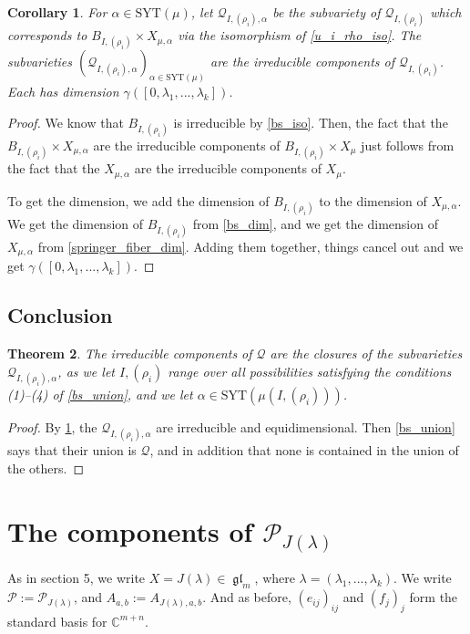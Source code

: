 \documentclass[12pt,psamsfonts]{article}
\DeclareMathOperator{\gl}{\mathfrak{gl}}
\newtheorem{theorem}{Theorem}[section]
\newtheorem{corollary}[theorem]{Corollary}
\begin{document}
\begin{corollary}\label{u_i_rho_irred_and_dim}
    For \(\alpha \in \mathrm{SYT}(\mu)\), let \(\mathcal{Q}_{I, (\rho_i), \alpha}\) be the subvariety of \(\mathcal{Q}_{I, (\rho_i)}\) which corresponds to \(B_{I, (\rho_i)} \times X_{\mu, \alpha}\) via the isomorphism of \cref{u_i_rho_iso}.
    The subvarieties \((\mathcal{Q}_{I, (\rho_i), \alpha})_{\alpha \in \mathrm{SYT}(\mu)}\) are the irreducible components of \(\mathcal{Q}_{I, (\rho_i)}\).
    Each has dimension \(\gamma([0, \lambda_1, ..., \lambda_k])\).
\end{corollary}
\begin{proof}
    We know that \(B_{I, (\rho_i)}\) is irreducible by \cref{bs_iso}.
    Then, the fact that the \(B_{I, (\rho_i)} \times X_{\mu, \alpha}\) are the irreducible components of \(B_{I, (\rho_i)} \times X_\mu\) just follows from the fact that the \(X_{\mu, \alpha}\) are the irreducible components of \(X_\mu\).
    \par To get the dimension, we add the dimension of \(B_{I, (\rho_i)}\) to the dimension of \(X_{\mu, \alpha}\).
    We get the dimension of \(B_{I, (\rho_i)}\) from \cref{bs_dim}, and we get the dimension of \(X_{\mu, \alpha}\) from \cref{springer_fiber_dim}.
    Adding them together, things cancel out and we get \(\gamma([0, \lambda_1, ..., \lambda_k])\).
\end{proof}

\subsection{Conclusion}
\begin{theorem}\label{Q_comps}
    The irreducible components of \(\mathcal{Q}\) are the closures of the subvarieties \(\mathcal{Q}_{I, (\rho_i), \alpha}\), as we let \(I, (\rho_i)\) range over all possibilities satisfying the conditions (1)--(4) of \cref{bs_union}, and we let \(\alpha \in \mathrm{SYT}(\mu(I, (\rho_i)))\).
\end{theorem}
\begin{proof}
    By \cref{u_i_rho_irred_and_dim}, the \(\mathcal{Q}_{I, (\rho_i), \alpha}\) are irreducible and equidimensional.
    Then \cref{bs_union} says that their union is \(\mathcal{Q}\), and in addition that none is contained in the union of the others.
\end{proof}

\section{The components of \texorpdfstring{\(\mathcal{P}_{J(\lambda)}\)}{P\_\{J(\textbackslash lambda)\}}}
As in section 5, we write \(X = J(\lambda) \in \gl_m\), where \(\lambda = (\lambda_1, ..., \lambda_k)\).
We write \(\mathcal{P} := \mathcal{P}_{J(\lambda)}\), and \(A_{a,b} := A_{J(\lambda), a, b}\).
And as before, \((e_{ij})_{ij}\) and \((f_j)_j\) form the standard basis for \(\mathbb{C}^{m + n}\).
\end{document}
